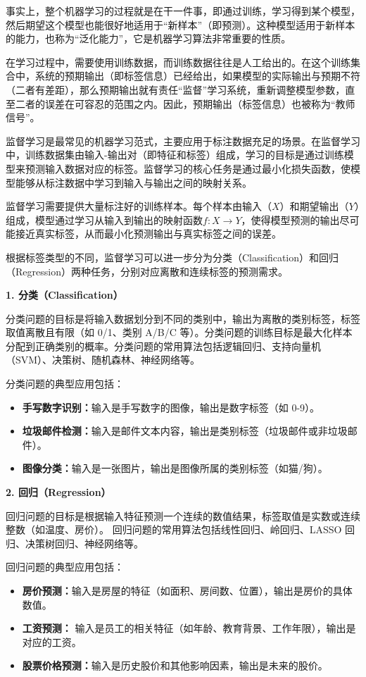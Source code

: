 事实上，整个机器学习的过程就是在干一件事，即通过训练，学习得到某个模型，然后期望这个模型也能很好地适用于“新样本”（即预测）。这种模型适用于新样本的能力，也称为“泛化能力”，它是机器学习算法非常重要的性质。

在学习过程中，需要使用训练数据，而训练数据往往是人工给出的。在这个训练集合中，系统的预期输出（即标签信息）已经给出，如果模型的实际输出与预期不符（二者有差距），那么预期输出就有责任“监督”学习系统，重新调整模型参数，直至二者的误差在可容忍的范围之内。因此，预期输出（标签信息）也被称为“教师信号”。

监督学习是最常见的机器学习范式，主要应用于标注数据充足的场景。在监督学习中，训练数据集由输入-输出对（即特征和标签）组成，学习的目标是通过训练模型来预测输入数据对应的标签。监督学习的核心任务是通过最小化损失函数，使模型能够从标注数据中学习到输入与输出之间的映射关系。

监督学习需要提供大量标注好的训练样本。每个样本由输入（$X$）和期望输出（$Y$）组成，模型通过学习从输入到输出的映射函数$f: X \rightarrow Y$，使得模型预测的输出尽可能接近真实标签，从而最小化预测输出与真实标签之间的误差。

根据标签类型的不同，监督学习可以进一步分为分类（Classification）和回归（Regression）两种任务，分别对应离散和连续标签的预测需求。

{\bf  1. 分类（Classification）}

分类问题的目标是将输入数据划分到不同的类别中，输出为离散的类别标签，标签取值离散且有限（如 0/1、类别 A/B/C 等）。分类问题的训练目标是最大化样本分配到正确类别的概率。分类问题的常用算法包括逻辑回归、支持向量机（SVM）、决策树、随机森林、神经网络等。

分类问题的典型应用包括：
\begin{itemize}
\item {\bf 手写数字识别：}输入是手写数字的图像，输出是数字标签（如 0-9）。
 \item {\bf  垃圾邮件检测：}输入是邮件文本内容，输出是类别标签（垃圾邮件或非垃圾邮件）。
\item {\bf  图像分类：}输入是一张图片，输出是图像所属的类别标签（如猫/狗）。
\end{itemize}

 {\bf  2. 回归（Regression）}
 
 回归问题的目标是根据输入特征预测一个连续的数值结果，标签取值是实数或连续整数（如温度、房价）。
回归问题的常用算法包括线性回归、岭回归、LASSO 回归、决策树回归、神经网络等。

回归问题的典型应用包括：
\begin{itemize}
 \item {\bf 房价预测：}输入是房屋的特征（如面积、房间数、位置），输出是房价的具体数值。
\item {\bf  工资预测：} 输入是员工的相关特征（如年龄、教育背景、工作年限），输出是对应的工资。
 \item {\bf 股票价格预测：}输入是历史股价和其他影响因素，输出是未来的股价。
\end{itemize}

